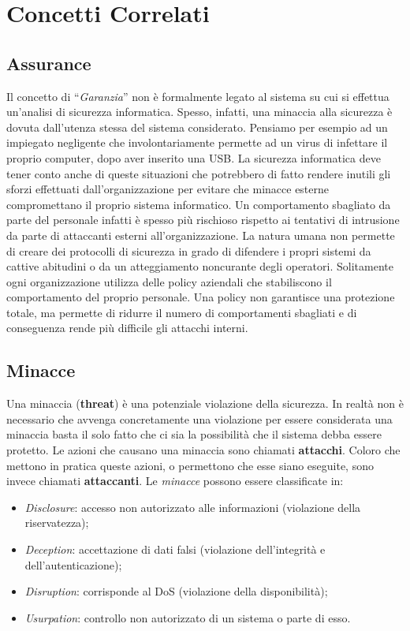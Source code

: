\section{Concetti Correlati}

\subsection{Assurance}

Il concetto di “\textit{Garanzia}” non è formalmente legato al sistema su cui si
effettua un’analisi di sicurezza informatica. Spesso, infatti, una minaccia
alla sicurezza è dovuta dall'utenza stessa del sistema considerato.
Pensiamo per esempio ad un impiegato negligente che involontariamente permette ad
un virus di infettare il proprio computer, dopo aver inserito una USB.
La sicurezza informatica deve tener conto anche di queste situazioni che
potrebbero di fatto rendere inutili gli sforzi effettuati dall'organizzazione
per evitare che minacce esterne compromettano il proprio sistema informatico.
Un comportamento sbagliato da parte del personale infatti è spesso più rischioso
rispetto ai tentativi di intrusione da parte di attaccanti esterni all’organizzazione.
La natura umana non permette di creare dei protocolli di sicurezza in grado di
difendere i propri sistemi da cattive abitudini o da un atteggiamento noncurante
degli operatori. Solitamente ogni organizzazione utilizza delle policy aziendali
che stabiliscono il comportamento del proprio personale. Una policy non
garantisce una protezione totale, ma permette di ridurre il numero di comportamenti
sbagliati e di conseguenza rende più difficile gli attacchi interni.

\subsection{Minacce}

Una minaccia (\textbf{threat}) è una potenziale violazione della sicurezza.
In realtà non è necessario che avvenga concretamente una violazione per essere
considerata una minaccia basta il solo fatto che ci sia la possibilità che
il sistema debba essere protetto.
Le azioni che causano una minaccia sono chiamati \textbf{attacchi}. Coloro che
mettono in pratica queste azioni, o permettono che esse siano eseguite, sono
invece chiamati \textbf{attaccanti}.
Le \textit{minacce} possono essere classificate in:

\begin{itemize}
      \item \textit{Disclosure}: accesso non autorizzato alle informazioni
            (violazione della riservatezza);
      \item \textit{Deception}: accettazione di dati falsi
            (violazione dell’integrità e dell’autenticazione);
      \item \textit{Disruption}: corrisponde al DoS
            (violazione della disponibilità);
      \item \textit{Usurpation}: controllo non autorizzato di un sistema o parte
            di esso.
\end{itemize}

